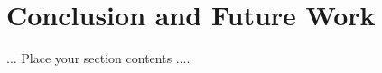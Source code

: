 \chapter{Conclusion and Future Work}
\ifpdf
    \graphicspath{{Chapter5/Chapter5Figs/PNG/}{Chapter5/Chapter5Figs/PDF/}{Chapter5/Chapter5Figs/}}
\else
    \graphicspath{{Chapter5/Chapter5Figs/EPS/}{Chapter5/Chapter5Figs/}}
\fi

... Place your section contents ....









